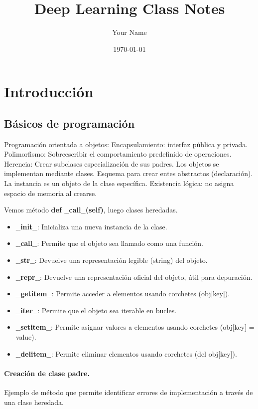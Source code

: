 \documentclass[12pt]{article}
\title{Deep Learning Class Notes}
\author{Your Name}
\date{\today}
\begin{document}
\maketitle

\section{Introducción}

\subsection{Básicos de programación}

Programación orientada a objetos: Encapsulamiento: interfaz pública y privada.
Polimorfismo: Sobreescribir el comportamiento predefinido de operaciones.
Herencia: Crear subclases especialización de sus padres.
Los objetos se implementan mediante clases. Esquema para crear entes abstractos (declaración). La instancia es un objeto de la clase específica. 
Existencia lógica: no asigna espacio de memoria al crearse.


Vemos método \textbf{def $\_\_$call$\_\_$(self)}, luego clases heredadas.

\begin{itemize}
    \item \textbf{$\_\_$init$\_\_$}: Inicializa una nueva instancia de la clase.
    \item \textbf{$\_\_$call$\_\_$}: Permite que el objeto sea llamado como una función.
    \item \textbf{$\_\_$str$\_\_$}: Devuelve una representación legible (string) del objeto.
    \item \textbf{$\_\_$repr$\_\_$}: Devuelve una representación oficial del objeto, útil para depuración.
    \item \textbf{$\_\_$getitem$\_\_$}: Permite acceder a elementos usando corchetes (obj[key]).
    \item \textbf{$\_\_$iter$\_\_$}: Permite que el objeto sea iterable en bucles.
    \item \textbf{$\_\_$setitem$\_\_$}: Permite asignar valores a elementos usando corchetes (obj[key] = value).
    \item \textbf{$\_\_$delitem$\_\_$}: Permite eliminar elementos usando corchetes (del obj[key]).
\end{itemize}


\paragraph{Creación de clase padre.} Ejemplo de método que permite identificar errores de implementación a través de una clase heredada.
\end{document}

